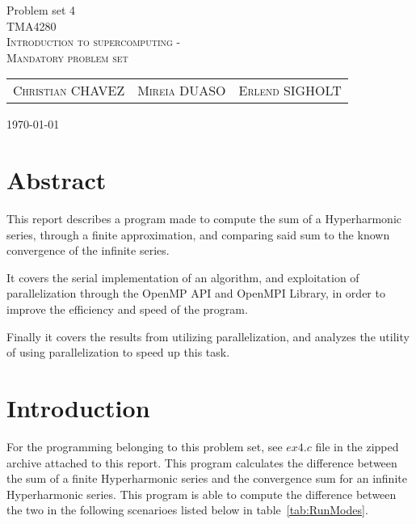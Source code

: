 \documentclass[fontsize=11pt,paper=a4,titlepage]{report}
\begin{document}
\begin{center}


{\huge Problem set 4}\\[0.5cm]

\textsc{\LARGE TMA4280}\\[0.5cm]
\textsc{\large Introduction to supercomputing -}\\
\textsc{\large Mandatory problem set}\\[0.6cm]

\begin{table}[h]
\centering
\begin{tabular}{ccc}
	\textsc{Christian CHAVEZ}	&	\textsc{Mireia DUASO}	&	\textsc{Erlend SIGHOLT}
\end{tabular}
\end{table}

\large{\today}
\vfill
\section*{Abstract}
This report describes a program made to compute the sum of a Hyperharmonic series, through a finite approximation, and comparing said sum to the known convergence of the infinite series.

It covers the serial implementation of an algorithm, and exploitation of parallelization through the OpenMP API and OpenMPI Library, in order to improve the efficiency and speed of the program.

Finally it covers the results from utilizing parallelization, and analyzes the utility of using parallelization to speed up this task.

\end{center}

\addtocounter{chapter}{1}

\clearpage
\section{Introduction}

For the programming belonging to this problem set, see $\textit{ex4.c}$ file in
the zipped archive attached to this report. This program calculates the
difference between the sum of a finite Hyperharmonic series and the convergence
sum for an infinite Hyperharmonic series. This program is able to compute the
difference between the two in the following scenarioes listed below in
table~\ref{tab:RunModes}.
\end{document}

